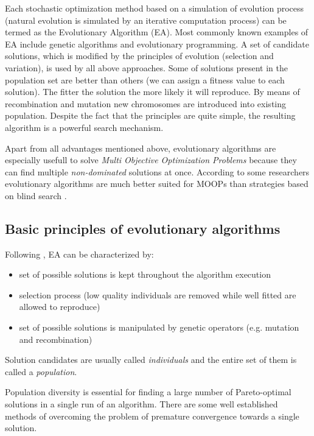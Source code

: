 Each stochastic optimization method based on a simulation of evolution process (natural evolution is simulated by an iterative computation process)
can be termed as the Evolutionary Algorithm (EA).
Most commonly known examples of EA include genetic algorithms and evolutionary programming.
A set of candidate solutions, which is modified by the principles of evolution (selection and variation), is used by all above approaches.
Some of solutions present in the population set are better than others (we can assign a fitness value to each solution).
The fitter the solution the more likely it will reproduce.
By means of recombination and mutation new chromosomes are introduced into existing population.
Despite the fact that the principles are quite simple, the resulting algorithm is a powerful search mechanism.  

Apart from all advantages mentioned above, evolutionary algorithms are especially usefull to solve \emph{Multi Objective Optimization Problems} because they
can find multiple \emph{non-dominated} solutions at once. 
According to some researchers evolutionary algorithms are much better suited for MOOPs than strategies based on blind search \cite{Phd}.

\subsection{Basic principles of evolutionary algorithms}

Following \cite{Phd}, EA can be characterized by:

\begin{itemize}
  \item set of possible solutions is kept throughout the algorithm execution
  \item selection process (low quality individuals are removed while well fitted are allowed to reproduce)
  \item set of possible solutions is manipulated by genetic operators (e.g. mutation and recombination)
\end{itemize}

Solution candidates are usually called \emph{individuals} and the entire set of them is called a \emph{population}. 
   
Population diversity is essential for finding a large number of Pareto-optimal solutions in a single run of an algorithm.
There are some well established methods of overcoming the problem of premature convergence towards a single solution. 

